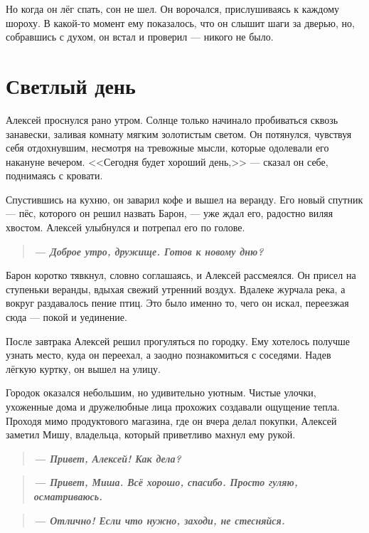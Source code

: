 \documentclass[12pt,a4paper]{book}
\newenvironment{dialogue}{\begin{quote}\itshape}{\end{quote}} %
\begin{document}
Но когда он лёг спать, сон не шел. Он ворочался, прислушиваясь к каждому шороху. В какой-то момент ему показалось, что он слышит шаги за дверью, но, собравшись с духом, он встал и проверил --- никого не было.

\chapter{Светлый день}

Алексей проснулся рано утром. Солнце только начинало пробиваться сквозь занавески, заливая комнату мягким золотистым светом. Он потянулся, чувствуя себя отдохнувшим, несмотря на тревожные мысли, которые одолевали его накануне вечером. <<Сегодня будет хороший день,>> --- сказал он себе, поднимаясь с кровати.

Спустившись на кухню, он заварил кофе и вышел на веранду. Его новый спутник --- пёс, которого он решил назвать Барон, --- уже ждал его, радостно виляя хвостом. Алексей улыбнулся и потрепал его по голове.

\begin{dialogue}
\textbf{--- Доброе утро, дружище. Готов к новому дню?}
\end{dialogue}

Барон коротко тявкнул, словно соглашаясь, и Алексей рассмеялся. Он присел на ступеньки веранды, вдыхая свежий утренний воздух. Вдалеке журчала река, а вокруг раздавалось пение птиц. Это было именно то, чего он искал, переезжая сюда --- покой и уединение.

После завтрака Алексей решил прогуляться по городку. Ему хотелось получше узнать место, куда он переехал, а заодно познакомиться с соседями. Надев лёгкую куртку, он вышел на улицу.

Городок оказался небольшим, но удивительно уютным. Чистые улочки, ухоженные дома и дружелюбные лица прохожих создавали ощущение тепла. Проходя мимо продуктового магазина, где он вчера делал покупки, Алексей заметил Мишу, владельца, который приветливо махнул ему рукой.

\begin{dialogue}
\textbf{--- Привет, Алексей! Как дела?}
\end{dialogue}

\begin{dialogue}
\textbf{--- Привет, Миша. Всё хорошо, спасибо. Просто гуляю, осматриваюсь.}
\end{dialogue}

\begin{dialogue}
\textbf{--- Отлично! Если что нужно, заходи, не стесняйся.}
\end{dialogue}
\end{document}
